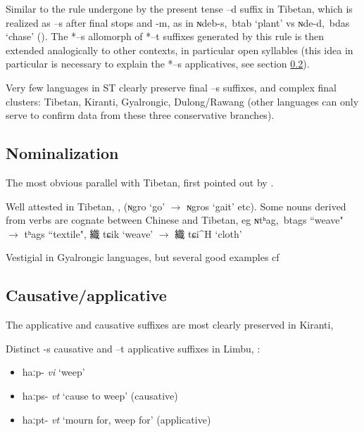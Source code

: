 \documentclass[oldfontcommands,oneside,a4paper,11pt]{article}
\newcommand{\ipa}[1]{{\phon \mbox{#1}}} %
\newcommand{\zh}[1]{{\cn #1}}
\newcommand{\ch}[3]{\zh{#1} \ipa{#2} `#3'}
\begin{document}
Similar to the rule undergone by the present tense \ipa{--d} suffix in Tibetan, which is realized as \ipa{--s} after final stops and \ipa{-m}, as in \ipa{ɴdeb-s, btab}   `plant' vs \ipa{ɴde-d, bdas}   `chase' (\citealt[52-53]{coblin76}). The *\ipa{--s} allomorph of *\ipa{--t} suffixes generated by this rule is then extended analogically to other contexts, in particular open syllables (this idea in particular is necessary to explain the *\ipa{--s} applicatives, see section \ref{sec:causative}).


Very few languages in ST clearly preserve final \ipa{--s} suffixes, and complex final clusters: Tibetan, Kiranti, Gyalrongic, Dulong/Rawang (other languages can only serve to confirm data from these three conservative branches). 

\subsection{Nominalization}
The most obvious parallel with Tibetan, first pointed out by \citet{forrest60occlusives}.

Well attested in Tibetan, \citet[43]{conrady1896}, \citet[624-5]{hill14derivational} (\ipa{ɴgro} `go'  $\rightarrow$ \ipa{ɴgros} `gait' etc). Some nouns derived from verbs are cognate between Chinese and Tibetan, eg \ipa{ɴtʰag, btags} ``weave" $\rightarrow$ \ipa{tʰags} ``textile", \ch{織}{tɕik}{weave} $\rightarrow$ \ch{織}{tɕi^H}{cloth} 

Vestigial in Gyalrongic languages, but several good examples cf \citet{jacques03s.houzhui}

 

\subsection{Causative/applicative} \label{sec:causative}
The applicative and causative suffixes are most clearly preserved in Kiranti, \citet{michailovsky85dental, jacques15derivational.khaling}

Distinct \ipa{-s} causative and \ipa{--t} applicative suffixes in Limbu, \citealt{michailovsky02dico}:
\begin{itemize}
\item \ipa{haːp-} \textit{vi} `weep'
\item \ipa{haːps-} \textit{vt} `cause to weep' (causative)
\item \ipa{haːpt-} \textit{vt} `mourn for, weep for' (applicative)
\end{itemize}
\end{document}
